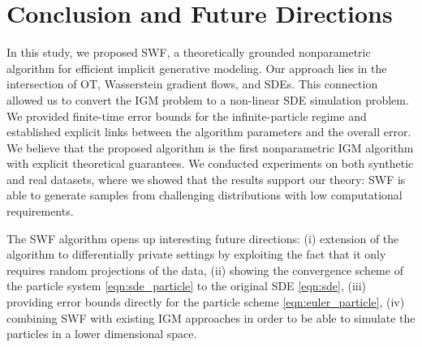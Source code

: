 
\section{Conclusion and Future Directions}

In this study, we proposed SWF, a theoretically grounded nonparametric algorithm for efficient implicit generative modeling. 
Our approach lies in the intersection of OT, Wasserstein gradient flows, and SDEs. This connection allowed us to convert the IGM problem to a non-linear SDE simulation problem. We provided finite-time error bounds for the infinite-particle regime and established explicit links between the algorithm parameters and the overall error. We believe that the proposed algorithm is the first nonparametric IGM algorithm with explicit theoretical guarantees. 
%
We conducted experiments on both synthetic and real datasets, where we showed that the results support our theory: SWF is able to generate samples from challenging distributions with low computational requirements. 

The SWF algorithm opens up interesting future directions: (i) extension of the algorithm to differentially private settings \cite{dwork2014algorithmic} by exploiting the fact that it only requires random projections of the data, (ii) showing the convergence scheme of the particle system \eqref{eqn:sde_particle} to the original SDE \eqref{eqn:sde}, (iii) providing error bounds directly for the particle scheme \eqref{eqn:euler_particle}, (iv) combining SWF with existing IGM approaches in order to be able to simulate the particles in a lower dimensional space.  
 